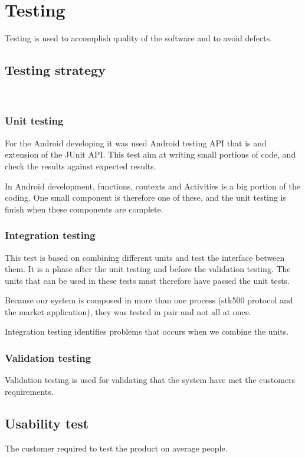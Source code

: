 \chapter{Testing}
	Testing is used to accomplish quality of the software and to avoid defects.
	
	\section{Testing strategy}
	\\
		\subsection{Unit testing}
			For the Android developing it was used Android testing API that is and extension of the JUnit API.
			This test aim at writing small portions of code, and check the results against expected results.

			In Android development, functions, contexts and Activities is a big portion of the coding.
			One small component is therefore one of these, and the unit testing is finish when these components are complete.

		\subsection{Integration testing}
			This test is based on combining different units and test the interface between them. It is a phase after the unit testing and before the validation testing. The units that can be used in these tests must therefore have passed the unit tests.

			Because our system is composed in more than one process (stk500 protocol and the market application), they 
			was tested in pair and not all at once.

			Integration testing identifies problems that occurs when we combine the units.

		\subsection{Validation testing}
			Validation testing is used for validating that the system have met the customers requirements.

	\section{Usability test}
		The customer required to test the product on average people.

